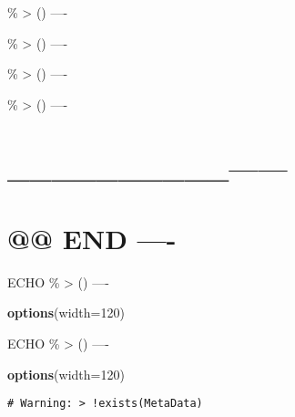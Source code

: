 \documentclass[
]{article}
\newenvironment{Shaded}{\begin{snugshade}}{\end{snugshade}}
\newcommand{\AttributeTok}[1]{\textcolor[rgb]{0.13,0.29,0.53}{#1}}
\newcommand{\DecValTok}[1]{\textcolor[rgb]{0.00,0.00,0.81}{#1}}
\newcommand{\FunctionTok}[1]{\textcolor[rgb]{0.13,0.29,0.53}{\textbf{#1}}}
\newcommand{\NormalTok}[1]{#1}
\begin{document}
\% \textbar\textgreater{} () ----

\% \textbar\textgreater{} () ----

\% \textbar\textgreater{} () ----

\% \textbar\textgreater{} () ----

\hypertarget{section-10}{%
\section{\_\_\_\_\_\_\_\_\_\_\textbar------}\label{section-10}}

\hypertarget{end--}{%
\section{@@ END ----}\label{end--}}

ECHO \% \textbar\textgreater{} () ----

\begin{Shaded}
\begin{Highlighting}[]
\FunctionTok{options}\NormalTok{(}\AttributeTok{width=}\DecValTok{120}\NormalTok{)}
\end{Highlighting}
\end{Shaded}

ECHO \% \textbar\textgreater{} () ----

\begin{Shaded}
\begin{Highlighting}[]
\FunctionTok{options}\NormalTok{(}\AttributeTok{width=}\DecValTok{120}\NormalTok{)}
\end{Highlighting}
\end{Shaded}

\begin{verbatim}
# Warning: > !exists(MetaData)
\end{verbatim}
\end{document}
